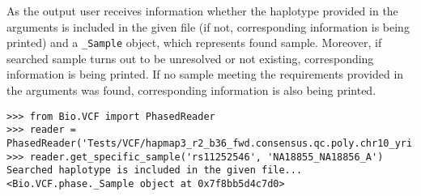\noindent As the output user receives information whether the haplotype provided in the arguments is included in the given file (if not, corresponding information 
is being printed) and a \verb|_Sample| object, which represents found sample. Moreover, if searched sample turns out to be unresolved or not existing, corresponding
information is being printed. If no sample meeting the requirements provided in the arguments was found, corresponding information is also being printed.

\begin{verbatim}
>>> from Bio.VCF import PhasedReader
>>> reader = PhasedReader('Tests/VCF/hapmap3_r2_b36_fwd.consensus.qc.poly.chr10_yri.D.phased')
>>> reader.get_specific_sample('rs11252546', 'NA18855_NA18856_A')
Searched haplotype is included in the given file...
<Bio.VCF.phase._Sample object at 0x7f8bb5d4c7d0>
\end{verbatim}

